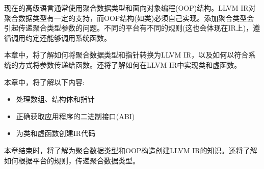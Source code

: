 
现在的高级语言通常使用聚合数据类型和面向对象编程(OOP)结构。LLVM IR对聚合数据类型有一定的支持，而OOP结构(如类)必须自己实现。添加聚合类型会引起传递聚合类型参数的问题。不同的平台有不同的规则(这也会体现在IR上)，遵循调用约定还能够调用系统函数。

本章中，将了解如何将聚合数据类型和指针转换为LLVM IR，以及如何以符合系统的方式将参数传递给函数。还将了解如何在LLVM IR中实现类和虚函数。

本章中，将了解以下内容:

\begin{itemize}
\item
处理数组、结构体和指针

\item
正确获取应用程序的二进制接口(ABI)

\item
为类和虚函数创建IR代码
\end{itemize}

本章结束时，将了解为聚合数据类型和OOP构造创建LLVM IR的知识。还将了解如何根据平台的规则，传递聚合数据类型。

































